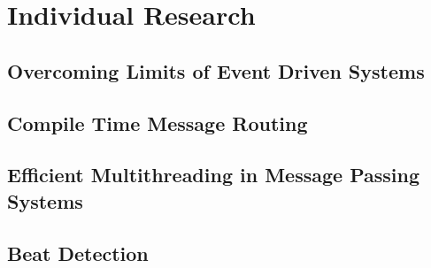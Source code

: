 \documentclass{beamer}
\begin{document}
\section{Individual Research}
\begin{frame}
\end{frame}

\subsection{Overcoming Limits of Event Driven Systems}
\begin{frame}
\end{frame}

\subsection{Compile Time Message Routing}
\begin{frame}
\end{frame}

\subsection{Efficient Multithreading in Message Passing Systems}
\begin{frame}
\end{frame}

\subsection{Beat Detection}
\begin{frame}
\end{frame}
\end{document}
